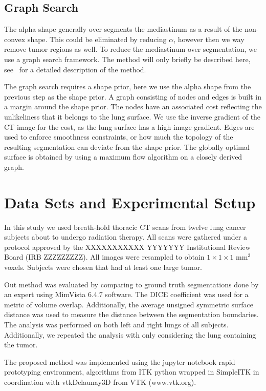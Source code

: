 \documentclass{llncs}
\begin{document}
\subsection{Graph Search}
%
The alpha shape generally over segments the mediastinum as a result of the non-convex shape. This could be eliminated by reducing $\alpha$, however then we way remove tumor regions as well. To reduce the mediastinum over segmentation, we use a graph search framework. The method will only briefly be described here, see~\cite{li2006} for a detailed description of the method. 

The graph search requires a shape prior, here we use the alpha shape from the previous step as the shape prior. A graph consisting of nodes and edges is built in a margin around the shape prior. The nodes have an associated cost reflecting the unlikeliness that it belongs to the lung surface. We use the inverse gradient of the CT image for the cost, as the lung surface has a high image gradient. Edges are used to enforce smoothness constraints, or how much the topology of the resulting segmentation can deviate from the shape prior. The globally optimal surface is obtained by using a maximum flow algorithm on a closely derived graph. 
 

%
\section{Data Sets and Experimental Setup}
%
In this study we used breath-hold thoracic CT scans from twelve lung cancer subjects about to undergo radiation therapy. All scans were gathered under a protocol approved by the 
XXXXXXXXXXX YYYYYYY 
Institutional Review Board 
(IRB ZZZZZZZZZ).
All images were resampled to obtain $1\times{}1\times{}1$ mm$^3$ voxels. Subjects were chosen that had at least one large tumor. 

Out method was evaluated by comparing to ground truth segmentations done by an expert using MimVista 6.4.7 software. The DICE coefficient was used for a metric of volume overlap. Additionally, the average unsigned symmetric surface distance was used to measure the distance between the segmentation boundaries. The analysis was performed on both left and right lungs of all subjects. Additionally, we repeated the analysis with only considering the lung containing the tumor.


The proposed method was implemented using the jupyter notebook \cite{PER-GRA:2007} rapid prototyping environment,  algorithms from ITK\cite{johnson2015itk} python wrapped in SimpleITK \cite{10.3389/fninf.2013.00045} in coordination with vtkDelaunay3D from VTK (www.vtk.org).
\end{document}
